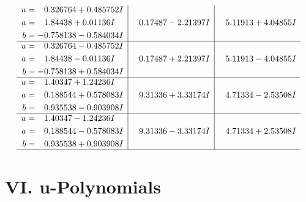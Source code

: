 \documentclass[1p]{elsarticle_modified}
\theoremstyle{definition}
\begin{document}
$$\begin{array}{c|c|c}
\begin{aligned}
u &= \phantom{-}0.326764 + 0.485752 I \\
a &= \phantom{-}1.84438 + 0.01136 I \\
b &= -0.758138 - 0.584034 I\end{aligned}
 & \phantom{-}0.17487 - 2.21397 I & \phantom{-}5.11913 + 4.04855 I \\ \hline\begin{aligned}
u &= \phantom{-}0.326764 - 0.485752 I \\
a &= \phantom{-}1.84438 - 0.01136 I \\
b &= -0.758138 + 0.584034 I\end{aligned}
 & \phantom{-}0.17487 + 2.21397 I & \phantom{-}5.11913 - 4.04855 I \\ \hline\begin{aligned}
u &= \phantom{-}1.40347 + 1.24236 I \\
a &= \phantom{-}0.188544 + 0.578083 I \\
b &= \phantom{-}0.935538 - 0.903908 I\end{aligned}
 & \phantom{-}9.31336 + 3.33174 I & \phantom{-}4.71334 - 2.53508 I \\ \hline\begin{aligned}
u &= \phantom{-}1.40347 - 1.24236 I \\
a &= \phantom{-}0.188544 - 0.578083 I \\
b &= \phantom{-}0.935538 + 0.903908 I\end{aligned}
 & \phantom{-}9.31336 - 3.33174 I & \phantom{-}4.71334 + 2.53508 I\\
 \hline 
 \end{array}$$\newpage
\newpage\renewcommand{\arraystretch}{1}
\centering \section*{ VI. u-Polynomials}
\end{document}
